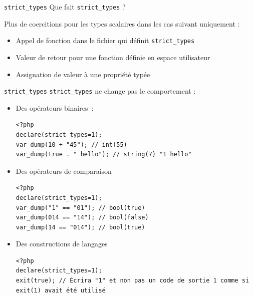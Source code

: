 \documentclass[10pt]{beamer}
\begin{document}
\begin{frame}[fragile]{\texttt{strict\_types}}
    Que fait \texttt{strict\_types} ?
    \pause
    
    Plus de coercitions pour les types scalaires dans les cas suivant \alert{uniquement} :
    \begin{itemize}
        \item Appel de fonction dans le fichier qui définit \texttt{strict\_types}
        \item Valeur de retour pour une fonction définie en espace utilisateur
        \item Assignation de valeur à une propriété typée
    \end{itemize}
\end{frame}
\begin{frame}[fragile]{\texttt{strict\_types}}
    \texttt{strict\_types} ne change \alert{pas} le comportement :

    \begin{itemize}
        \item Des opérateurs binaires~:
            \begin{verbatim}
<?php
declare(strict_types=1);
var_dump(10 + "45"); // int(55)
var_dump(true . " hello"); // string(7) "1 hello"
            \end{verbatim}
        \item Des opérateurs de comparaison
            \begin{verbatim}
<?php
declare(strict_types=1);
var_dump("1" == "01"); // bool(true)
var_dump(014 == "14"); // bool(false)
var_dump(14 == "014"); // bool(true)
            \end{verbatim}
        \item Des constructions de langages
            \begin{verbatim}
<?php
declare(strict_types=1);
exit(true); // Écrira "1" et non pas un code de sortie 1 comme si exit(1) avait été utilisé
            \end{verbatim}
    \end{itemize}
\end{frame}
\end{document}
